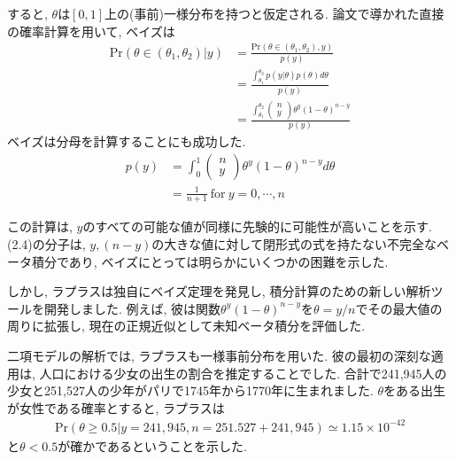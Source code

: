 \documentclass[10pt,dvipdfmx,a4]{beamer}
\newcommand{\eq}[1]{\begin{align}#1\end{align}}
\newcommand{\eqn}[1]{\begin{align*}#1\end{align*}}
\begin{document}

\begin{frame}
すると, $\theta$は$[0,1]$上の(事前)一様分布を持つと仮定される.
論文で導かれた直接の確率計算を用いて, ベイズは
\eq{\text{Pr}(\theta\in(\theta_1,\theta_2)|y)&=\frac{\text{Pr}(\theta\in(\theta_1,\theta_2),y)}{p(y)}\nonumber\\
&=\frac{\int_{\theta_1}^{\theta_2}p(y|\theta)p(\theta)d\theta}{p(y)}\nonumber\\
&=\frac{\int_{\theta_1}^{\theta_2}\left(\begin{array}{c}n\\y\end{array}\right)\theta^y(1-\theta)^{n-y}}{p(y)}}
ベイズは分母を計算することにも成功した.
\eq{p(y)&=\int_0^1\left(\begin{array}{c}n\\y\end{array}\right)\theta^y(1-\theta)^{n-y}d\theta\nonumber\\
&=\frac{1}{n+1}\ \text{for}\ y=0,\cdots,n}
\end{frame}


\begin{frame}
この計算は, $y$のすべての可能な値が同様に先験的に可能性が高いことを示す.
(2.4)の分子は, $y, (n-y)$の大きな値に対して閉形式の式を持たない不完全なベータ積分であり, ベイズにとっては明らかにいくつかの困難を示した.

しかし, ラプラスは独自にベイズ定理を発見し, 積分計算のための新しい解析ツールを開発しました.
例えば, 彼は関数$\theta^y(1-\theta)^{n-y}$を$\theta=y/n$でその最大値の周りに拡張し, 現在の正規近似として未知ベータ積分を評価した.

二項モデルの解析では, ラプラスも一様事前分布を用いた.
彼の最初の深刻な適用は, 人口における少女の出生の割合を推定することでした.
合計で241,945人の少女と251,527人の少年がパリで1745年から1770年に生まれました.
$\theta$をある出生が女性である確率とすると, ラプラスは
\eqn{\text{Pr}(\theta\geq 0.5|y=241,945, n=251.527+241,945)\simeq 1.15\times 10^{-42}}
と$\theta<0.5$が確かであるということを示した.
\end{frame}

\end{document}
